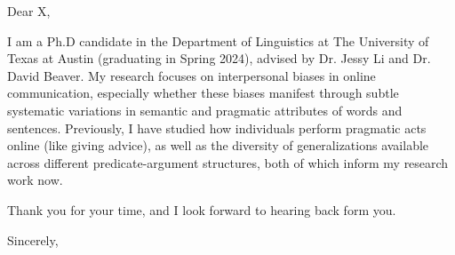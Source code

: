 \documentclass{practical-letter}
\begin{document}
\opening{Dear X,}

I am a Ph.D candidate in the Department of Linguistics at The University of Texas at Austin (graduating in Spring 2024), advised by Dr. Jessy Li and Dr. David Beaver. My research focuses on interpersonal biases in online communication, especially whether these biases manifest through subtle systematic variations in semantic and pragmatic attributes of words and sentences. Previously, I have studied how individuals perform pragmatic acts online (like giving advice), as well as the diversity of generalizations available across different predicate-argument structures, both of which inform my research work now.

\lipsum[1-1]

Thank you for your time, and I look forward to hearing back form you.




\closing{Sincerely,}

\end{document}
